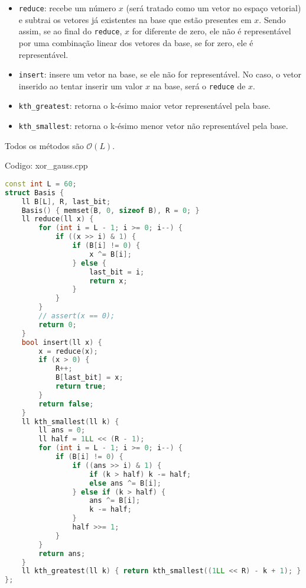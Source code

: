 \documentclass[10pt, a4paper, oneside]{book}
\begin{document}
\begin{itemize}
\item \texttt{reduce}: recebe um número $x$ (será tratado como um vetor no espaço vetorial) e subtrai os vetores já existentes na base que estão presentes em $x$. Sendo assim, se ao final do \texttt{reduce}, $x$ for diferente de zero, ele não é representável por uma combinação linear dos vetores da base, se for zero, ele é representável.
\item \texttt{insert}: insere um vetor na base, se ele não for representável. No caso, o vetor inserido ao tentar inserir um valor $x$ na base, será o \texttt{reduce} de $x$.
\item \texttt{kth\_greatest}: retorna o k-ésimo maior vetor representável pela base.
\item \texttt{kth\_smallest}: retorna o k-ésimo menor vetor não representável pela base.
\end{itemize}



Todos os métodos são $\mathcal{O}(L)$.
\hfill

Codigo: xor\_gauss.cpp

\begin{lstlisting}[language=C++]
const int L = 60;
struct Basis {
    ll B[L], R, last_bit;
    Basis() { memset(B, 0, sizeof B), R = 0; }
    ll reduce(ll x) {
        for (int i = L - 1; i >= 0; i--) {
            if ((x >> i) & 1) {
                if (B[i] != 0) {
                    x ^= B[i];
                } else {
                    last_bit = i;
                    return x;
                }
            }
        }
        // assert(x == 0);
        return 0;
    }
    bool insert(ll x) {
        x = reduce(x);
        if (x > 0) {
            R++;
            B[last_bit] = x;
            return true;
        }
        return false;
    }
    ll kth_smallest(ll k) {
        ll ans = 0;
        ll half = 1LL << (R - 1);
        for (int i = L - 1; i >= 0; i--) {
            if (B[i] != 0) {
                if ((ans >> i) & 1) {
                    if (k > half) k -= half;
                    else ans ^= B[i];
                } else if (k > half) {
                    ans ^= B[i];
                    k -= half;
                }
                half >>= 1;
            }
        }
        return ans;
    }
    ll kth_greatest(ll k) { return kth_smallest((1LL << R) - k + 1); }
};
\end{lstlisting}
\hfill

\newpage

%
%
%
%
\end{document}
